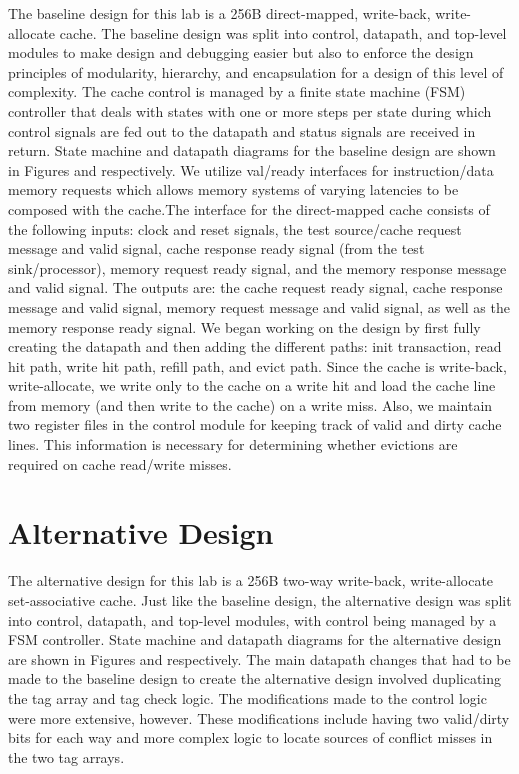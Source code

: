 \documentclass[10pt]{article}
\begin{document}
The baseline design for this lab is a 256B direct-mapped, write-back, write-allocate cache. The baseline design was split into control, datapath, and top-level modules to make design and debugging easier but also to enforce the design principles of modularity, hierarchy, and encapsulation for a design of this level of complexity. The cache control is managed by a finite state machine (FSM) controller that deals with states with one or more steps per state during which control signals are fed out to the datapath and status signals are received in return. State machine and datapath diagrams for the baseline design are shown in Figures and respectively. We utilize val/ready interfaces for instruction/data memory requests which allows memory systems of varying latencies to be composed with the cache.The interface for the direct-mapped cache consists of the following inputs: clock and reset signals, the test source/cache request message and valid signal, cache response ready signal (from the test sink/processor), memory request ready signal, and the memory response message and valid signal. The outputs are: the cache request ready signal, cache response message and valid signal, memory request message and valid signal, as well as the memory response ready signal. We began working on the design by first fully creating the datapath and then adding the different paths: init transaction, read hit path, write hit path, refill path, and evict path. Since the cache is write-back, write-allocate, we write only to the cache on a write hit and load the cache line from memory (and then write to the cache) on a write miss. Also, we maintain two register files in the control module for keeping track of valid and dirty cache lines. This information is necessary for determining whether evictions are required on cache read/write misses. \\


\section{Alternative Design}

The alternative design for this lab is a 256B two-way write-back, write-allocate set-associative cache. Just like the baseline design, the alternative design was split into control, datapath, and top-level modules, with control being managed by a FSM controller. State machine and datapath diagrams for the alternative design are shown in Figures and respectively. The main datapath changes that had to be made to the baseline design to create the alternative design involved duplicating the tag array and tag check logic. The modifications made to the control logic were more extensive, however. These modifications include having two valid/dirty bits for each way and more complex logic to locate sources of conflict misses in the two tag arrays.  \\
\end{document}
